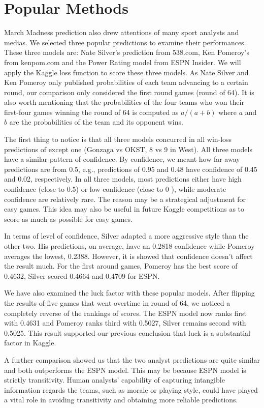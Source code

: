 \documentclass[10pt,a4paper]{article}
\begin{document}
\section{Popular Methods}
March Madness prediction also drew attentions of many sport analysts and medias. We selected three popular predictions to examine their performances. These three models are: Nate Silver's prediction from 538.com, Ken Pomeroy's from kenpom.com and the Power Rating model from ESPN Insider. We will apply the Kaggle loss function to score these three models. As Nate Silver and Ken Pomeroy only published probabilities of each team advancing to a certain round, our comparison only considered the first round games (round of 64). It is also worth mentioning that the probabilities of the four teams who won their first-four games winning the round of 64 is computed as \(a/(a+b)\) where \(a\) and \(b\) are the probabilities of the team and its opponent wins. 

The first thing to notice is that all three models concurred in all win-loss predictions of except one (Gonzaga vs OKST, 8 vs 9 in West). All three models have a similar pattern of confidence. By confidence, we meant how far away predictions are from 0.5, e.g., predictions of 0.95 and 0.48 have confidence of 0.45 and 0.02, respectively. In all three models, most predictions either have high confidence (close to 0.5) or low confidence (close to 0 ), while moderate confidence are relatively rare. The reason may be a strategical adjustment for easy games. This idea may also be useful in future Kaggle competitions as to score as much as possible for easy games.

In terms of level of confidence, Silver adapted a more aggressive style than the other two. His predictions, on average, have an 0.2818 confidence while Pomeroy averages the lowest, 0.2388. However, it is showed that confidence doesn't affect the result much. For the first around games, Pomeroy has the best score of 0.4632, Silver scored 0.4664 and 0.4709 for ESPN. 

We have also examined the luck factor with these popular models. After flipping the results of five games that went overtime in round of 64, we noticed a completely reverse of the rankings of scores. The ESPN model now ranks first with 0.4631 and Pomeroy ranks third with 0.5027, Silver remains second with 0.5025. This result supported our previous conclusion that luck is a substantial factor in Kaggle. 

A further comparison showed us that the two analyst predictions are quite similar and both outperforms the ESPN model. This may be because ESPN model is strictly transitivity. Human analysts' capability of capturing intangible information regards the teams, such as  morale or playing style, could have played a vital role in avoiding transitivity and obtaining more reliable predictions.         

 

 
\end{document}
